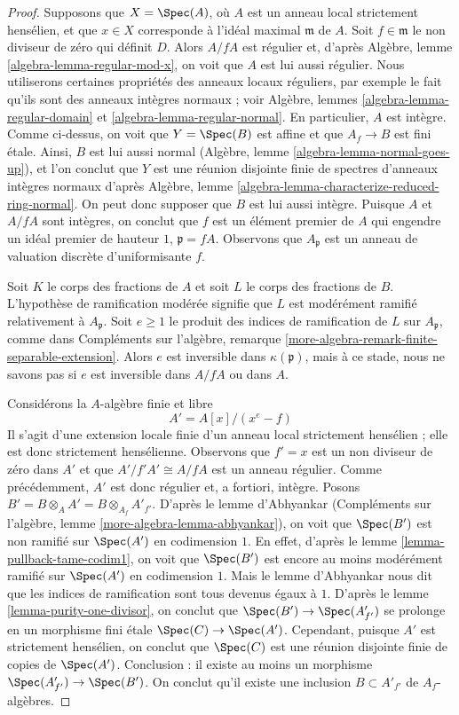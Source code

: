 \begin{proof}
\medskip\noindent
Supposons que $X = \Spec(A)$, où $A$ est un anneau local strictement hensélien,
et que $x \in X$ corresponde à l'idéal maximal $\mathfrak m$ de $A$.
Soit $f \in \mathfrak m$ le non diviseur de zéro qui définit $D$.
Alors $A/fA$ est régulier et, d'après Algèbre, lemme \ref{algebra-lemma-regular-mod-x},
on voit que $A$ est lui aussi régulier. Nous utiliserons certaines propriétés des anneaux
locaux réguliers, par exemple le fait qu'ils sont des anneaux intègres normaux ; voir
Algèbre, lemmes \ref{algebra-lemma-regular-domain} et
\ref{algebra-lemma-regular-normal}. En particulier, $A$ est intègre.
Comme ci-dessus, on voit que $Y = \Spec(B)$ est affine et que $A_f \to B$
est fini \'etale. Ainsi, $B$ est lui aussi normal
(Algèbre, lemme \ref{algebra-lemma-normal-goes-up}),
et l'on conclut que $Y$ est une réunion disjointe finie de spectres d'anneaux intègres normaux d'après
Algèbre, lemme \ref{algebra-lemma-characterize-reduced-ring-normal}.
On peut donc supposer que $B$ est lui aussi intègre.
Puisque $A$ et $A/fA$ sont intègres, on conclut que $f$ est un élément
premier de $A$ qui engendre un idéal premier de hauteur $1$, $\mathfrak p = fA$.
Observons que $A_\mathfrak p$ est un anneau de valuation discrète d'uniformisante $f$.

\medskip\noindent
Soit $K$ le corps des fractions de $A$ et soit $L$ le corps des
fractions de $B$. L'hypothèse de ramification modérée signifie que
$L$ est modérément ramifié relativement à $A_\mathfrak p$.
Soit $e \geq 1$ le produit des indices de ramification de $L$
sur $A_\mathfrak p$, comme dans
Compléments sur l'algèbre, remarque \ref{more-algebra-remark-finite-separable-extension}.
Alors $e$ est inversible dans $\kappa(\mathfrak p)$, mais
à ce stade, nous ne savons pas si $e$ est inversible dans $A/fA$
ou dans $A$.

\medskip\noindent
Considérons la $A$-algèbre finie et libre
$$
A' = A[x]/(x^e - f)
$$
Il s'agit d'une extension locale finie d'un anneau local
strictement hensélien ; elle est donc strictement hensélienne.
Observons que $f' = x$ est un non diviseur de zéro dans $A'$ et que
$A'/f'A' \cong A/fA$ est un anneau régulier. Comme précédemment, $A'$
est donc régulier et, a fortiori, intègre. Posons
$B' = B \otimes_A A' = B \otimes_{A_f} A'_{f'}$.
D'après le lemme d'Abhyankar
(Compléments sur l'algèbre, lemme \ref{more-algebra-lemma-abhyankar}),
on voit que $\Spec(B')$ est non ramifié sur $\Spec(A')$
en codimension $1$. En effet, d'après le lemme \ref{lemma-pullback-tame-codim1},
on voit que $\Spec(B')$ est encore au moins modérément ramifié
sur $\Spec(A')$ en codimension $1$. Mais le lemme d'Abhyankar
nous dit que les indices de ramification sont tous devenus égaux à $1$.
D'après le lemme \ref{lemma-purity-one-divisor}, on conclut que
$\Spec(B') \to \Spec(A'_{f'})$ se prolonge en un morphisme fini \'etale
$\Spec(C) \to \Spec(A')$. Cependant, puisque $A'$ est strictement hensélien,
on conclut que $\Spec(C)$ est une réunion disjointe finie de copies
de $\Spec(A')$. Conclusion : il existe au moins un morphisme
$\Spec(A'_{f'}) \to \Spec(B')$. On conclut qu'il existe
une inclusion $B \subset A'_{f'}$ de $A_f$-algèbres.


\end{proof}
